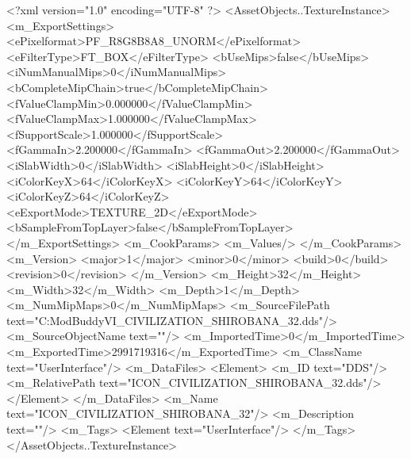 <?xml version="1.0" encoding="UTF-8" ?>
<AssetObjects..TextureInstance>
	<m_ExportSettings>
		<ePixelformat>PF_R8G8B8A8_UNORM</ePixelformat>
		<eFilterType>FT_BOX</eFilterType>
		<bUseMips>false</bUseMips>
		<iNumManualMips>0</iNumManualMips>
		<bCompleteMipChain>true</bCompleteMipChain>
		<fValueClampMin>0.000000</fValueClampMin>
		<fValueClampMax>1.000000</fValueClampMax>
		<fSupportScale>1.000000</fSupportScale>
		<fGammaIn>2.200000</fGammaIn>
		<fGammaOut>2.200000</fGammaOut>
		<iSlabWidth>0</iSlabWidth>
		<iSlabHeight>0</iSlabHeight>
		<iColorKeyX>64</iColorKeyX>
		<iColorKeyY>64</iColorKeyY>
		<iColorKeyZ>64</iColorKeyZ>
		<eExportMode>TEXTURE_2D</eExportMode>
		<bSampleFromTopLayer>false</bSampleFromTopLayer>
	</m_ExportSettings>
	<m_CookParams>
		<m_Values/>
	</m_CookParams>
	<m_Version>
		<major>1</major>
		<minor>0</minor>
		<build>0</build>
		<revision>0</revision>
	</m_Version>
	<m_Height>32</m_Height>
	<m_Width>32</m_Width>
	<m_Depth>1</m_Depth>
	<m_NumMipMaps>0</m_NumMipMaps>
	<m_SourceFilePath text="C:\Users\asus\Documents\Firaxis ModBuddy\Civilization VI\temppic\ICON_CIVILIZATION_SHIROBANA_32.dds"/>
	<m_SourceObjectName text=""/>
	<m_ImportedTime>0</m_ImportedTime>
	<m_ExportedTime>2991719316</m_ExportedTime>
	<m_ClassName text="UserInterface"/>
	<m_DataFiles>
		<Element>
			<m_ID text="DDS"/>
			<m_RelativePath text="ICON_CIVILIZATION_SHIROBANA_32.dds"/>
		</Element>
	</m_DataFiles>
	<m_Name text="ICON_CIVILIZATION_SHIROBANA_32"/>
	<m_Description text=""/>
	<m_Tags>
		<Element text="UserInterface"/>
	</m_Tags>
</AssetObjects..TextureInstance>

